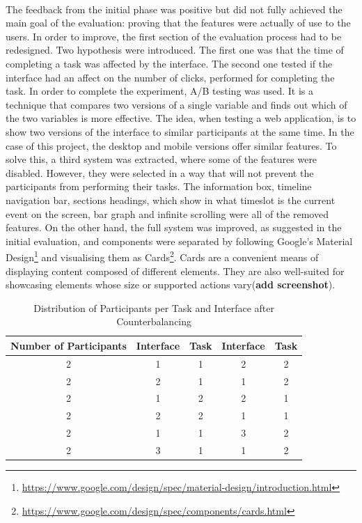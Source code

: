 \documentclass{l4proj}
\begin{document}
{\paragraph{}
The feedback from the initial phase was positive but did not fully achieved the main goal of the evaluation: proving that the features were actually of use to the users. In order to improve, the first section of the evaluation process had to be redesigned. Two hypothesis were introduced. The first one was that the time of completing a task was affected by the interface. The second one tested if the interface had an affect on the number of clicks, performed for completing the task. In order to complete the experiment, A/B testing was used. It is a technique that compares two versions of a single variable and finds out which of the two variables is more effective. The idea, when testing a web application, is to show two versions of the interface to similar participants at the same time. In the case of this project, the desktop and mobile versions offer similar features. To solve this, a third system was extracted, where some of the features were disabled. However, they were selected in a way that will not prevent the participants from performing their tasks. The information box, timeline navigation bar, sections headings, which show in what timeslot is the current event on the screen, bar graph and infinite scrolling were all of the removed features. On the other hand, the full system was improved, as suggested in the initial evaluation, and components were separated by following Google's Material Design\footnote{\url{https://www.google.com/design/spec/material-design/introduction.html}} and visualising them as Cards\footnote{\url{https://www.google.com/design/spec/components/cards.html}}. Cards are a convenient means of displaying content composed of different elements. They are also well-suited for showcasing elements whose size or supported actions vary(\textbf{add screenshot}).

\begin{table}[H]
	\centering
	\begin{tabular}{|c|c|c|c|c|} \hline
		Number of Participants&	Interface & Task &	Interface & Task \\ \hline
		2 	& 1	& 1	& 2 & 2  \\ \hline
		2	& 2	& 1	& 1 & 2  \\ \hline
		2 	& 1	& 2	& 2 & 1  \\ \hline
		2	& 2	& 2 & 1 & 1  \\ \hline
		2 	& 1	& 1	& 3 & 2  \\ \hline
		2	& 3	& 1	& 1 & 2  \\ \hline
	\end{tabular}
	\caption{Distribution of Participants per Task and Interface after Counterbalancing}
	\label{tab:counterbalancing}
\end{table}

}
\end{document}
